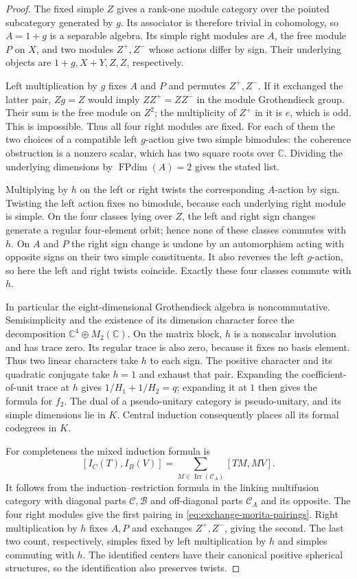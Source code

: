 \documentclass[11pt,a4paper]{article}
\numberwithin{equation}{section}
\begin{document}
\begin{proof}
The fixed simple $Z$ gives a rank-one module category over the pointed
subcategory generated by $g$. Its associator is therefore trivial in
cohomology, so $A=1+g$ is a separable algebra.
Its simple right modules are $A$, the free module $P$ on $X$,
and two modules $Z^+,Z^-$ whose actions differ by sign.
Their underlying objects are $1+g,X+Y,Z,Z$, respectively.

Left multiplication by $g$ fixes $A$ and $P$ and permutes $Z^+,Z^-$.
If it exchanged the latter pair, $Zg=Z$ would imply
$ZZ^+=ZZ^-$ in the module Grothendieck group. Their sum is the free
module on $Z^2$; the multiplicity of $Z^+$ in it is $e$, which is
odd. This is impossible. Thus all four right modules are fixed.
For each of them the two choices of a compatible left $g$-action
give two simple bimodules: the coherence obstruction is a nonzero
scalar, which has two square roots over $\mathbb C$. Dividing the
underlying dimensions by $\operatorname{FPdim}(A)=2$ gives the stated
list.

Multiplying by $h$ on the left or right twists the corresponding
$A$-action by sign. Twisting the left action fixes no bimodule,
because each underlying right module is simple. On the four classes
lying over $Z$, the left and right sign changes generate a regular
four-element orbit; hence none of these classes commutes with $h$.
On $A$ and $P$ the right sign change is undone by an automorphism
acting with opposite signs on their two simple constituents. It
also reverses the left $g$-action, so here the left and right twists
coincide. Exactly these four classes commute with $h$.

In particular the eight-dimensional Grothendieck algebra is
noncommutative. Semisimplicity and the existence of its dimension
character force the decomposition $\mathbb C^4\oplus M_2(\mathbb C)$.
On the matrix block, $h$ is a nonscalar involution and has trace zero.
Its regular trace is also zero, because it fixes no basis element.
Thus two linear characters take $h$ to each sign. The positive
character and its quadratic conjugate take $h=1$ and exhaust that
pair. Expanding the coefficient-of-unit trace at $h$ gives
$1/H_1+1/H_2=q$; expanding it at $1$ then gives the formula for $f_2$.
The dual of a pseudo-unitary category is pseudo-unitary, and its
simple dimensions lie in $K$. Central induction consequently places
all its formal codegrees in $K$.

For completeness the mixed induction formula is
\[
 [I_C(T),I_B(V)]
 =\sum_{M\in\operatorname{Irr}(\mathcal C_A)}[TM,MV].
\]
It follows from the induction--restriction formula in the linking
multifusion category with diagonal parts $\mathcal C,\mathcal B$
and off-diagonal parts $\mathcal C_A$ and its opposite.
The four right modules give the first pairing in
\eqref{eq:exchange-morita-pairings}. Right multiplication by $h$
fixes $A,P$ and exchanges $Z^+,Z^-$, giving the second.
The last two count, respectively, simples fixed by left multiplication
by $h$ and simples commuting with $h$. The identified centers have
their canonical positive spherical structures, so the identification
also preserves twists.
\end{proof}
\end{document}
